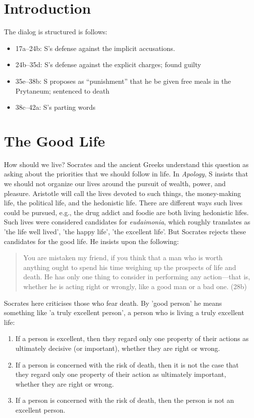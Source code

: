 \documentclass[oneside]{article}
\begin{document}
\thispagestyle{fancy}

\section*{Introduction}

The dialog is structured is follows: 

\begin{itemize}
\item 17a--24b: S's defense against the implicit accusations. 
\item 24b--35d: S's defense against the explicit charges; found guilty
\item  35e--38b: S proposes as ``punishment'' that he be given free meals in the Prytaneum; sentenced to death
\item 38c--42a: S's parting words
\end{itemize}



\section*{The Good Life}

How should we live? Socrates and the ancient Greeks understand this question as asking about the priorities that we should follow in life. In \emph{Apology}, S insists that we should not organize our lives around the pursuit of wealth, power, and pleasure. Aristotle will call the lives devoted to such things, the money-making life, the political life, and the hedonistic life. There are different ways such lives could be pursued, e.g., the drug addict and foodie are both living hedonistic lifes. Such lives were considered candidates for \emph{eudaimonia}, which roughly translates as 'the life well lived', 'the happy life', 'the excellent life'. But Socrates rejects these candidates for the good life. He insists upon the following: 

\begin{quote}
You are mistaken my friend, if you think that a man who is worth anything ought to spend his time weighing up the prospects of life and death. He has only one thing to consider in performing any action---that is, whether he is acting right or wrongly, like a good man or a bad one. (28b)
\end{quote}
Socrates here criticises those who fear death. By 'good person' he means something like 'a truly excellent person', a person who is living a truly excellent life: 
\begin{enumerate}
\item If a person is excellent, then they regard only one property of their actions as ultimately decisive (or important), whether they are right or wrong.
\item If a person is concerned with the risk of death, then it is not the case that they regard only one property of their action as ultimately important, whether they are right or wrong.
\item If a person is concerned with the risk of death, then the person is not an excellent person.
\end{enumerate}
\end{document}
